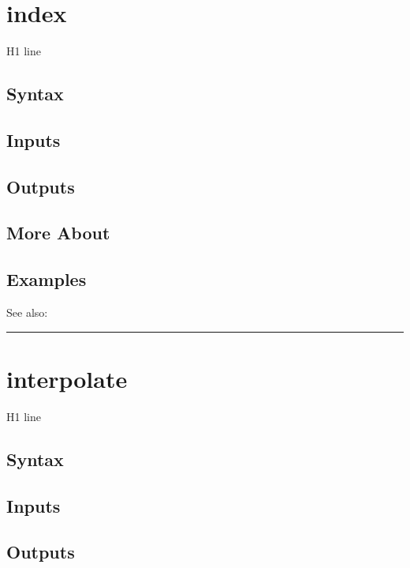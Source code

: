 \documentclass[letterpaper,10pt,english]{sphinxmanual}
\begin{document}
\section{index}
\label{classes/time_series/@ts/ts:index}\label{classes/time_series/@ts/ts:id277}
H1 line


\subsection{Syntax}
\label{classes/time_series/@ts/ts:id278}

\subsection{Inputs}
\label{classes/time_series/@ts/ts:id279}

\subsection{Outputs}
\label{classes/time_series/@ts/ts:id280}

\subsection{More About}
\label{classes/time_series/@ts/ts:id281}

\subsection{Examples}
\label{classes/time_series/@ts/ts:id282}
See also:


\bigskip\hrule{}\bigskip



\section{interpolate}
\label{classes/time_series/@ts/ts:id283}\label{classes/time_series/@ts/ts:interpolate}
H1 line


\subsection{Syntax}
\label{classes/time_series/@ts/ts:id284}

\subsection{Inputs}
\label{classes/time_series/@ts/ts:id285}

\subsection{Outputs}
\label{classes/time_series/@ts/ts:id286}
\end{document}
